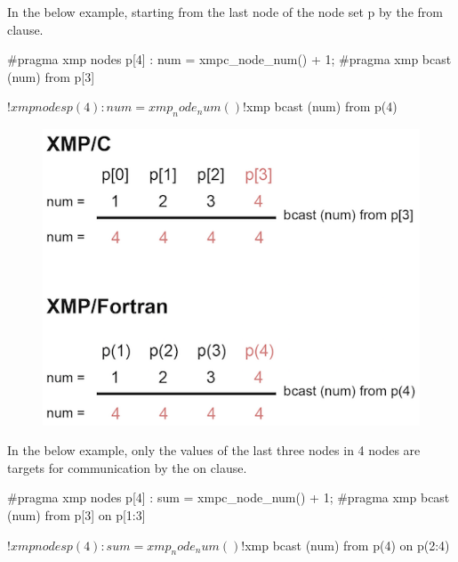 In the below example, starting from the last node of the node set p by
the from clause.

\begin{XCexample}
#pragma xmp nodes p[4]
  :
num = xmpc_node_num() + 1;
#pragma xmp bcast (num) from p[3]
\end{XCexample}

\begin{XFexample}
!$xmp nodes p(4)
  :
num = xmp_node_num()
!$xmp bcast (num) from p(4)
\end{XFexample}

\begin{figure}
  \centering
  \includegraphics{figs/bcast_from.png}
\end{figure}

In the below example, only the values of the last three nodes in 4 nodes
are targets for communication by the on clause.

\begin{XCexample}
#pragma xmp nodes p[4]
  :
sum = xmpc_node_num() + 1;
#pragma xmp bcast (num) from p[3] on p[1:3]
\end{XCexample}

\begin{XFexample}
!$xmp nodes p(4)
  :
 sum = xmp_node_num()
 !$xmp bcast (num) from p(4) on p(2:4)
\end{XFexample}

